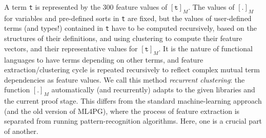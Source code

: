 A term \lstinline?t? is represented by the $300$ feature values of $[\texttt{t}]_M$.
The values of $[.]_{M}$
for  variables  and pre-defined sorts in \lstinline?t? are fixed, but the values of user-defined terms (and types!) contained in \texttt{t}
have to be computed recursively, based
on the structures of their definitions, and %
using clustering to compute their feature vectors, and their representative values for $[\texttt{t}]_M$. %
It is the nature of functional languages to have terms depending on other terms, and feature extraction/clustering cycle is 
repeated recursively to reflect complex mutual term dependencies as feature values.  %
 We call this method \emph{recurrent clustering}: the function $[.]_M$ automatically (and recurrently) adapts to the given libraries and the current proof stage. %
% 
This differs from the standard machine-learning approach (and the old version of ML4PG), where the process of feature extraction is separated from running pattern-recognition algorithms. Here, one is a crucial part of another.


